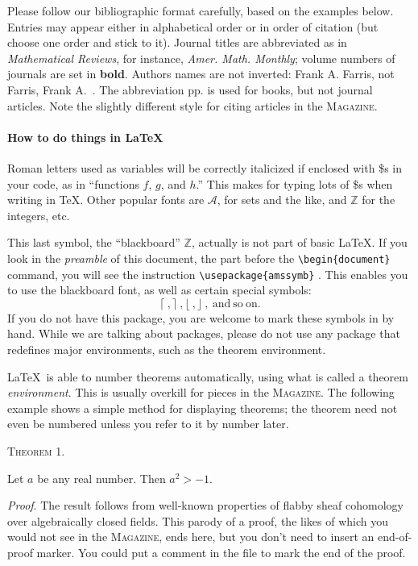 \documentclass[12pt]{article}
\begin{document}
Please follow our bibliographic format carefully, based
on the examples below.  Entries may appear either in alphabetical
order or in order of citation (but choose one order and
stick to it).   Journal titles are abbreviated
as in \emph{Mathematical Reviews},
for instance, \textit{Amer. Math. Monthly}; volume numbers
of journals are set in \textbf{bold}.  Authors names are
not inverted: Frank A. Farris, not Farris, Frank A.~\cite{Farris}.
The abbreviation pp. is used for books, but not journal
articles.  Note the slightly different style for
citing articles in the \textsc{Magazine}.


\paragraph*{How to do things in \LaTeX}

Roman letters used as variables will be correctly
italicized if enclosed with \$s in your code, as in ``functions $f$, $g$, and $h$.''
This makes for typing lots of \$s when writing in \TeX.
Other popular fonts are $\mathcal A$, for sets and the like, and
${\mathbb Z}$ for the integers, etc.

This last symbol, the ``blackboard'' ${\mathbb Z}$, actually
is not part of basic \LaTeX.  If you look in the \textit{preamble}
of this document, the part before the \verb+\begin{document}+
command, you will see the instruction \verb+\usepackage{amssymb}+ .
This enables you to use the blackboard font, as well as certain special symbols:
$$\lceil \  , \rceil \  , \lfloor \  , \rfloor  \ , \mathrm {\ and  \ so \  on.}$$
\noindent
If you do not have this package, you are welcome to mark these
symbols in by hand. While we are talking about packages,
please do not use any package that redefines major environments,
such as the theorem environment.

\LaTeX\ is able to number theorems automatically,
using what is called a theorem
\textit{environment}.  This is usually overkill for pieces in the \textsc{Magazine}.
The following example shows a simple method for displaying
theorems; the theorem need not even be numbered unless
you refer to it by number later.

\textsc{Theorem 1.}

Let $a$ be any real number.   Then $a^2 > -1$.


\textit{Proof}.  The result follows from well-known
properties of flabby sheaf cohomology over algebraically closed
fields. This parody of a proof, the likes of which you would not see
in the \textsc{Magazine}, ends here, but you don't need to insert
an end-of-proof marker.  You could put a comment in the file to mark
the end of the proof.
\end{document}
